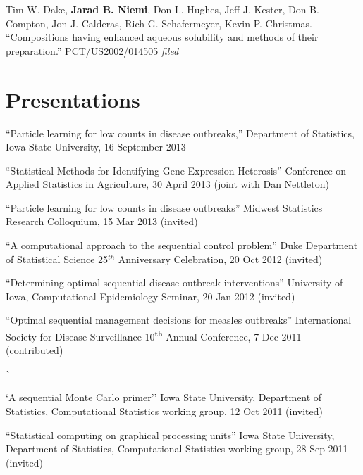 \documentclass[overlapped,line]{res}
\begin{document}
\begin{resume}
Tim W. Dake, {\bf Jarad B. Niemi}, Don L. Hughes, Jeff J. Kester, Don B. Compton, Jon J. Calderas, Rich G. Schafermeyer, Kevin P. Christmas. ``Compositions having enhanced aqueous solubility and methods of their preparation.'' PCT/US2002/014505 \emph{filed}



\section{\bf Presentations}

%

{\small

``Particle learning for low counts in disease outbreaks,'' Department of Statistics, Iowa State University, 16 September 2013

``Statistical Methods for Identifying Gene Expression Heterosis'' Conference on Applied Statistics in Agriculture, 30 April 2013 (joint with Dan Nettleton)

``Particle learning for low counts in disease outbreaks'' Midwest Statistics Research Colloquium, 15 Mar 2013 (invited)

``A computational approach to the sequential control problem'' Duke Department of Statistical Science 25$^{th}$ Anniversary Celebration, 20 Oct 2012 (invited)

``Determining optimal sequential disease outbreak interventions'' University of Iowa, Computational Epidemiology Seminar, 20 Jan 2012 (invited)

``Optimal sequential management decisions for measles outbreaks'' International Society for Disease Surveillance 10\textsuperscript{th} Annual Conference, 7 Dec 2011 (contributed)


\newpage\opening 

``A sequential Monte Carlo primer'' Iowa State University, Department of Statistics, Computational Statistics working group, 12 Oct 2011 (invited)

``Statistical computing on graphical processing units'' Iowa State University, Department of Statistics, Computational Statistics working group, 28 Sep 2011 (invited)

}
\end{resume}
\end{document}
